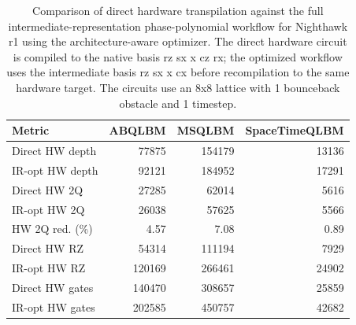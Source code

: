 \begin{table}[ht]
\centering
\begin{tabular}{lrrr}
\hline
Metric & ABQLBM & MSQLBM & SpaceTimeQLBM \\
\hline
Direct HW depth & 77875 & 154179 & 13136 \\
IR-opt HW depth & 92121 & 184952 & 17291 \\
Direct HW 2Q & 27285 & 62014 & 5616 \\
IR-opt HW 2Q & 26038 & 57625 & 5566 \\
HW 2Q red. (\%) & 4.57 & 7.08 & 0.89 \\
Direct HW RZ & 54314 & 111194 & 7929 \\
IR-opt HW RZ & 120169 & 266461 & 24902 \\
Direct HW gates & 140470 & 308657 & 25859 \\
IR-opt HW gates & 202585 & 450757 & 42682 \\
\hline
\end{tabular}
\caption{Comparison of direct hardware transpilation against the full intermediate-representation phase-polynomial workflow for Nighthawk r1 using the architecture-aware optimizer. The direct hardware circuit is compiled to the native basis rz sx x cz rx; the optimized workflow uses the intermediate basis rz sx x cx before recompilation to the same hardware target. The circuits use an 8x8 lattice with 1 bounceback obstacle and 1 timestep.}
\label{tab:phase-poly-ir-flow-comparison-8x8-obs1-t1-ibm-nighthawk-r1-2025-architecture-aware}
\end{table}
